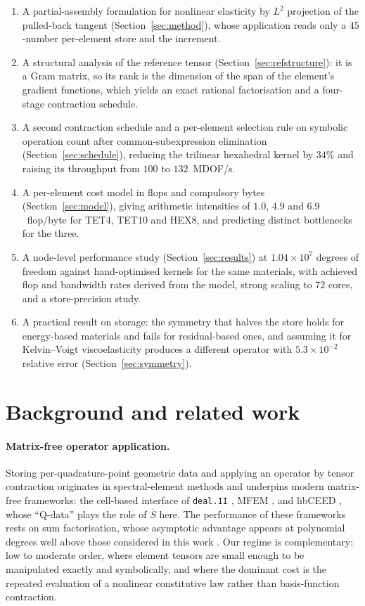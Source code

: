 \documentclass[11pt]{article}
\newcommand{\Sbar}{\overline{S}}
\begin{document}
\begin{enumerate}[leftmargin=1.5em,itemsep=2pt]
\item A partial-assembly formulation for nonlinear elasticity by $L^2$ projection
  of the pulled-back tangent (Section~\ref{sec:method}), whose application reads
  only a $45$-number per-element store and the increment.
\item A structural analysis of the reference tensor
  (Section~\ref{sec:refstructure}): it is a Gram matrix, so its rank is the
  dimension of the span of the element's gradient functions, which yields an
  exact rational factorisation and a four-stage contraction schedule.
\item A second contraction schedule and a per-element selection rule on symbolic
  operation count after common-subexpression elimination
  (Section~\ref{sec:schedule}), reducing the trilinear hexahedral kernel by
  $34\%$ and raising its throughput from $100$ to $132$~MDOF/s.
\item A per-element cost model in flops and compulsory bytes
  (Section~\ref{sec:model}), giving arithmetic intensities of $1.0$, $4.9$ and
  $6.9$~flop/byte for TET4, TET10 and HEX8, and predicting distinct bottlenecks
  for the three.
\item A node-level performance study (Section~\ref{sec:results}) at
  $1.04\times10^{7}$ degrees of freedom against hand-optimised kernels for the
  same materials, with achieved flop and bandwidth rates derived from the model,
  strong scaling to $72$ cores, and a store-precision study.
\item A practical result on storage: the symmetry that halves the store holds for
  energy-based materials and fails for residual-based ones, and assuming it for
  Kelvin--Voigt viscoelasticity produces a different operator with
  $5.3\times10^{-2}$ relative error (Section~\ref{sec:symmetry}).
\end{enumerate}

\section{Background and related work}

\paragraph{Matrix-free operator application.}  Storing per-quadrature-point geometric
data and applying an operator by tensor contraction originates in
spectral-element methods \cite{Orszag1980,DevilleFischerMund2002} and underpins
modern matrix-free frameworks: the cell-based interface of \texttt{deal.II}
\cite{KronbichlerKormann2012,KronbichlerKormann2019}, MFEM \cite{MFEM2021}, and
libCEED \cite{libCEED2021}, whose ``Q-data'' plays the role of $\Sbar$ here.
The performance of these frameworks rests on sum factorisation, whose asymptotic
advantage appears at polynomial degrees well above those considered in this work
\cite{MelenkGerdesSchwab2001,Kolev2021}.  Our regime is complementary: low to
moderate order, where element tensors are small enough to be manipulated exactly
and symbolically, and where the dominant cost is the repeated evaluation of a
nonlinear constitutive law rather than basis-function contraction.
\end{document}
